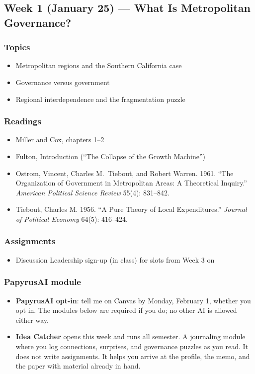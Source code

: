 \documentclass[12pt]{article}
\begin{document}
\subsection*{Week 1 (January 25) --- What Is Metropolitan Governance?}
    \subsubsection*{Topics}
        \begin{itemize}
            \item Metropolitan regions and the Southern California case
            \item Governance versus government
            \item Regional interdependence and the fragmentation puzzle
        \end{itemize}
    \subsubsection*{Readings}
        \begin{itemize}
            \item Miller and Cox, chapters 1--2
            \item Fulton, Introduction (``The Collapse of the Growth Machine'')
            \item Ostrom, Vincent, Charles M.\ Tiebout, and Robert Warren. 1961. ``The Organization of Government in Metropolitan Areas: A Theoretical Inquiry.'' \emph{American Political Science Review} 55(4): 831--842.
            \item Tiebout, Charles M. 1956. ``A Pure Theory of Local Expenditures.'' \emph{Journal of Political Economy} 64(5): 416--424.
        \end{itemize}
    \subsubsection*{Assignments}
        \begin{itemize}
            \item Discussion Leadership sign-up (in class) for slots from Week 3 on
        \end{itemize}
    \subsubsection*{PapyrusAI module}
        \begin{itemize}
            \item \textbf{PapyrusAI opt-in}: tell me on Canvas by Monday, February 1, whether you opt in. The modules below are required if you do; no other AI is allowed either way.
            \item \textbf{Idea Catcher} opens this week and runs all semester. A journaling module where you log connections, surprises, and governance puzzles as you read. It does not write assignments. It helps you arrive at the profile, the memo, and the paper with material already in hand.
        \end{itemize}
\end{document}
